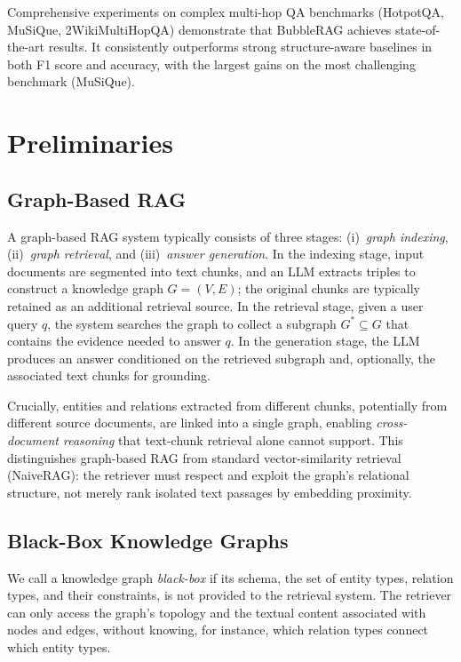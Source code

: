  Comprehensive experiments on complex multi-hop QA benchmarks (HotpotQA, MuSiQue, 2WikiMultiHopQA) demonstrate that BubbleRAG achieves state-of-the-art results. It consistently outperforms strong structure-aware baselines in both F1 score and accuracy, with the largest gains on the most challenging benchmark (MuSiQue).


\section{Preliminaries}\label{sec:preliminaries}

\subsection{Graph-Based RAG}

A graph-based RAG system typically consists of three stages: (i)~\emph{graph indexing}, (ii)~\emph{graph retrieval}, and (iii)~\emph{answer generation}. In the indexing stage, input documents are segmented into text chunks, and an LLM extracts triples to construct a knowledge graph $G=(V,E)$; the original chunks are typically retained as an additional retrieval source. In the retrieval stage, given a user query $q$, the system searches the graph to collect a subgraph $G^* \subseteq G$ that contains the evidence needed to answer $q$. In the generation stage, the LLM produces an answer conditioned on the retrieved subgraph and, optionally, the associated text chunks for grounding.

Crucially, entities and relations extracted from different chunks, potentially from different source documents, are linked into a single graph, enabling \emph{cross-document reasoning} that text-chunk retrieval alone cannot support. This distinguishes graph-based RAG from standard vector-similarity retrieval (NaiveRAG): the retriever must respect and exploit the graph's relational structure, not merely rank isolated text passages by embedding proximity.

\subsection{Black-Box Knowledge Graphs}

We call a knowledge graph \emph{black-box} if its schema, the set of entity types, relation types, and their constraints, is not provided to the retrieval system. The retriever can only access the graph's topology and the textual content associated with nodes and edges, without knowing, for instance, which relation types connect which entity types.

